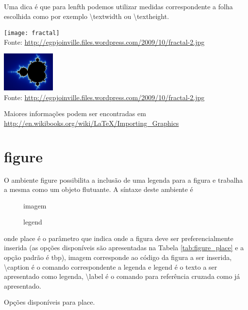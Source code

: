 Uma dica é que para \textsf{lenfth} podemos utilizar medidas correspondente a folha escolhida como por exemplo \textbackslash\textsf{textwidth} ou \textbackslash\textsf{textheight}.\\
\begin{minipage}[t]{0.47\linewidth}
    \vspace{-8pt}
    \begin{latexcode}
        \vspace{0pt}
        \texttt{[image: fractal]} \\
        Fonte: \url{http://egpjoinville.files.wordpress.com/2009/10/fractal-2.jpg}
    \end{latexcode}
\end{minipage} \hfill
\begin{minipage}[t]{0.47\linewidth}
    \vspace{0pt}
    \includegraphics[height=2cm]{figures/fractal} \\
    Fonte: \url{http://egpjoinville.files.wordpress.com/2009/10/fractal-2.jpg}
\end{minipage}

Maiores informações podem ser encontradas em  \url{http://en.wikibooks.org/wiki/LaTeX/Importing_Graphics}

\section{\textsf{figure}}

O ambiente \textsf{figure} possibilita a inclusão de uma legenda para a figura e trabalha a mesma como um objeto flutuante. A síntaxe deste ambiente é
\begin{latexcode}
    \begin{figure}[place]
        imagem
        \caption{legend}
        \label{P:imagem}
    \end{figure}
\end{latexcode}
onde \textsf{place} é o parâmetro que indica onde a figura deve ser preferencialmente inserida (as opções disponíveis são apresentadas na Tabela \ref{tab:figure_place} e a opção padrão é \textsf{tbp}), \textsf{imagem} corresponde ao código da figura a ser inserida, \textbackslash\textsf{caption} é o comando correspondente a legenda e \textsf{legend} é o texto a ser apresentado como legenda, \textbackslash\textsf{label} é o comando para referência cruzada como já apresentado.
\begin{table}[!htb]
    \centering
    \caption{Opções disponíveis para \textsf{place}.}
    \label{tab:figure_place}
    
\end{table}


